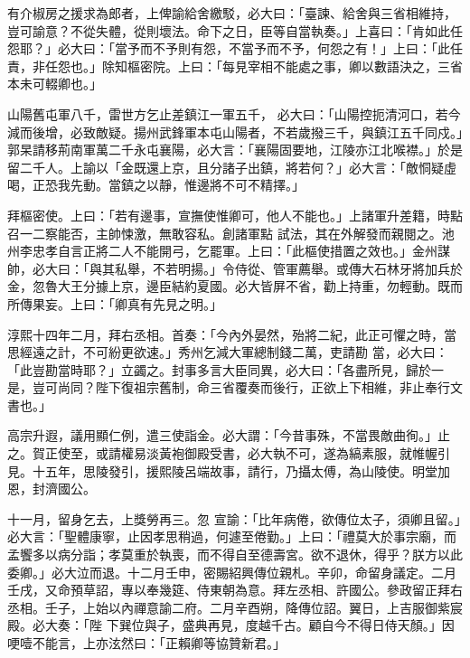 \begin{pinyinscope}
 有介椒房之援求為郎者，上俾諭給舍繳駁，必大曰：「臺諫、給舍與三省相維持，豈可諭意？不從失體，從則壞法。命下之日，臣等自當執奏。」上喜曰：「肯如此任怨耶？」必大曰：「當予而不予則有怨，不當予而不予，何怨之有！」上曰：「此任責，非任怨也。」除知樞密院。上曰：「每見宰相不能處之事，卿以數語決之，三省本未可輟卿也。」



 山陽舊屯軍八千，雷世方乞止差鎮江一軍五千，
 必大曰：「山陽控扼清河口，若今減而後增，必致敵疑。揚州武鋒軍本屯山陽者，不若歲撥三千，與鎮江五千同戍。」郭杲請移荊南軍萬二千永屯襄陽，必大言：「襄陽固要地，江陵亦江北喉襟。」於是留二千人。上諭以「金既還上京，且分諸子出鎮，將若何？」必大言：「敵恫疑虛喝，正恐我先動。當鎮之以靜，惟邊將不可不精擇。」



 拜樞密使。上曰：「若有邊事，宣撫使惟卿可，他人不能也。」上諸軍升差籍，時點召一二察能否，主帥悚激，無敢容私。創諸軍點
 試法，其在外解發而親閱之。池州李忠孝自言正將二人不能開弓，乞罷軍。上曰：「此樞使措置之效也。」金州謀帥，必大曰：「與其私舉，不若明揚。」令侍從、管軍薦舉。或傳大石林牙將加兵於金，忽魯大王分據上京，邊臣結約夏國。必大皆屏不省，勸上持重，勿輕動。既而所傳果妄。上曰：「卿真有先見之明。」



 淳熙十四年二月，拜右丞相。首奏：「今內外晏然，殆將二紀，此正可懼之時，當思經遠之計，不可紛更欲速。」秀州乞減大軍總制錢二萬，吏請勘
 當，必大曰：「此豈勘當時耶？」立蠲之。封事多言大臣同異，必大曰：「各盡所見，歸於一是，豈可尚同？陛下復祖宗舊制，命三省覆奏而後行，正欲上下相維，非止奉行文書也。」



 高宗升遐，議用顯仁例，遣三使詣金。必大謂：「今昔事殊，不當畏敵曲徇。」止之。賀正使至，或請權易淡黃袍御殿受書，必大執不可，遂為縞素服，就帷幄引見。十五年，思陵發引，援熙陵呂端故事，請行，乃攝太傅，為山陵使。明堂加恩，封濟國公。



 十一月，留身乞去，上獎勞再三。忽
 宣諭：「比年病倦，欲傳位太子，須卿且留。」必大言：「聖體康寧，止因孝思稍過，何遽至倦勤。」上曰：「禮莫大於事宗廟，而孟饗多以病分詣；孝莫重於執喪，而不得自至德壽宮。欲不退休，得乎？朕方以此委卿。」必大泣而退。十二月壬申，密賜紹興傳位親札。辛卯，命留身議定。二月壬戌，又命預草詔，專以奉幾筵、侍東朝為意。拜左丞相、許國公。參政留正拜右丞相。壬子，上始以內禪意諭二府。二月辛酉朔，降傳位詔。翼日，上吉服御紫宸殿。必大奏：「陛
 下巽位與子，盛典再見，度越千古。顧自今不得日侍天顏。」因哽噎不能言，上亦泫然曰：「正賴卿等協贊新君。」




\end{pinyinscope}
